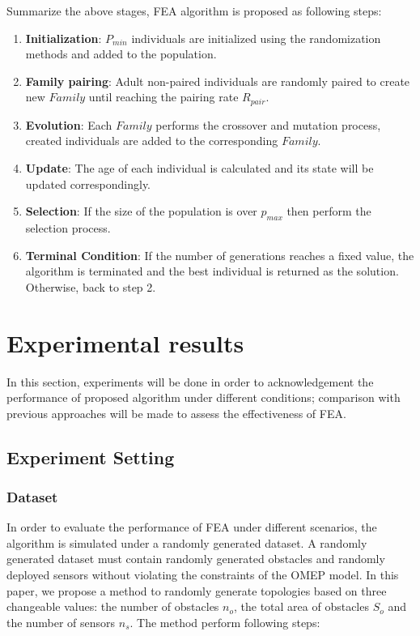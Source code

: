 \documentclass[final]{elsarticle}
\begin{document}
Summarize the above stages, FEA algorithm is proposed as following steps:

\begin{enumerate}
	\item \textbf{Initialization}: $P_{min}$ individuals are initialized using the randomization methods and added to the population.
	\item \textbf{Family pairing}: Adult non-paired individuals are randomly paired to create new $ Family $ until reaching the pairing rate $R_{pair}$.
	\item \textbf{Evolution}: Each $ Family $ performs the crossover and mutation process, created individuals are added to the corresponding $ Family $.
	\item \textbf{Update}: The age of each individual is calculated and its state will be updated correspondingly.
	\item \textbf{Selection}: If the size of the population is over $p_{max}$ then perform the selection process.
	\item \textbf{Terminal Condition}: If the number of generations reaches a fixed value, the algorithm is terminated and the best individual is returned as the solution. Otherwise, back to step 2.
\end{enumerate}

\section{Experimental results}
In this section, experiments will be done in order to acknowledgement the performance of proposed algorithm under different conditions; comparison with previous approaches will be made to assess the effectiveness of FEA. 
\subsection{Experiment Setting}
\subsubsection{Dataset}
In order to evaluate the performance of FEA under different scenarios, the algorithm is simulated under a randomly generated dataset. A randomly generated dataset must contain randomly generated obstacles and randomly deployed sensors without violating the constraints of the OMEP model. In this paper, we propose a method to randomly generate topologies based on three changeable values: the number of obstacles $n_o$, the total area of obstacles $S_o$ and the number of sensors $n_s$. The method perform following steps: 
\end{document}
